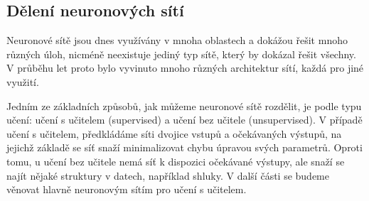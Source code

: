\begin{center}
\end{center}

\subsection{Dělení neuronových sítí}

Neuronové sítě jsou dnes využívány v mnoha oblastech a dokážou řešit mnoho
různých úloh, nicméně neexistuje jediný typ sítě, který by dokázal řešit
všechny. V průběhu let proto bylo vyvinuto mnoho různých architektur sítí,
každá pro jiné využití.

Jedním ze základních způsobů, jak můžeme neuronové sítě rozdělit, je podle typu
učení: učení s učitelem (supervised) a učení bez učitele (unsupervised). V
případě učení s učitelem, předkládáme síti dvojice vstupů a očekávaných
výstupů, na jejichž základě se síť snaží minimalizovat chybu úpravou svých
parametrů. Oproti tomu, u učení bez učitele nemá síť k dispozici očekávané
výstupy, ale snaží se najít nějaké struktury v datech, například shluky. V
další části se budeme věnovat hlavně neuronovým sítím pro učení s učitelem.

